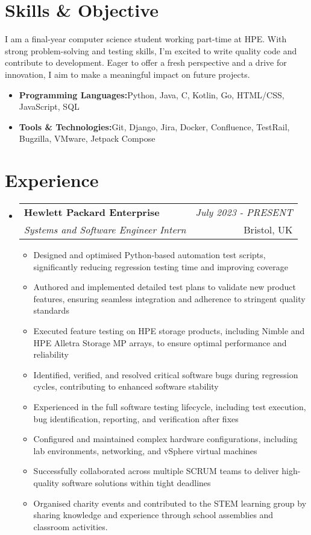 \documentclass[a4paper,11pt]{article}
\makeatletter
\newcommand{\resumeItem}[2]{
  \item{
    \textbf{#1}{\hspace{0.5mm}#2 \vspace{-0.5mm}}
  }
}
\newcommand{\resumeSubheading}[4]{
\vspace{0.5mm}\item
    \begin{tabular*}{0.98\textwidth}[t]{l@{\extracolsep{\fill}}r}
        \textbf{#1} & \textit{\footnotesize{#4}} \\
        \textit{\footnotesize{#3}} &  \footnotesize{#2}\\
    \end{tabular*}
    \vspace{-1mm}
}
\newcommand{\resumeSubItem}[2]{\resumeItem{#1}{#2}\vspace{-4pt}}
\newcommand{\resumeSubHeadingListStart}{\begin{itemize}[leftmargin=*,labelsep=1mm]}
\newcommand{\resumeHeadingSkillStart}{\begin{itemize}[leftmargin=*,itemsep=1.7mm, rightmargin=2ex]}
\newcommand{\resumeItemListStart}{\begin{itemize}[leftmargin=*,labelsep=1mm,itemsep=0.5mm]}
\newcommand{\resumeSubHeadingListEnd}{\end{itemize}\vspace{2mm}}
\newcommand{\resumeHeadingSkillEnd}{\end{itemize}\vspace{-2mm}}
\newcommand{\resumeItemListEnd}{\end{itemize}\vspace{-2mm}}
\makeatother
\begin{document}
\section{\textbf{Skills \& Objective}}
\vspace{1mm}
\small{
I am a final-year computer science student working part-time at HPE. With strong problem-solving and testing skills, I’m excited to write quality code and contribute to development. Eager to offer a fresh perspective and a drive for innovation, I aim to make a meaningful impact on future projects.
\vspace{1mm}
 \resumeHeadingSkillStart
  \resumeSubItem{Programming Languages:}
    {Python, Java, C, Kotlin, Go, HTML/CSS, JavaScript, SQL}
  \resumeSubItem{Tools \& Technologies:}
    {Git, Django, Jira, Docker, Confluence, TestRail, Bugzilla, VMware, Jetpack Compose }
 \resumeHeadingSkillEnd


 

\section{\textbf{Experience}}
\vspace{-0.4mm}
  \resumeSubHeadingListStart
  \resumeSubheading
      {{Hewlett Packard Enterprise}}{Bristol, UK}
      {Systems and Software Engineer Intern}{July 2023 - PRESENT}
      \resumeItemListStart
        \item Designed and optimised Python-based automation test scripts, significantly reducing regression testing time and improving coverage
        \item Authored and implemented detailed test plans to validate new product features, ensuring seamless integration and adherence to stringent quality standards
        \item Executed feature testing on HPE storage products, including Nimble and HPE Alletra Storage MP arrays, to ensure optimal performance and reliability
        \item Identified, verified, and resolved critical software bugs during regression cycles, contributing to enhanced software stability
        \item Experienced in the full software testing lifecycle, including test execution, bug identification, reporting, and verification after fixes
        \item Configured and maintained complex hardware configurations, including lab environments, networking, and vSphere virtual machines
        \item Successfully collaborated across multiple SCRUM teams to deliver high-quality software solutions within tight deadlines
        \item Organised charity events and contributed to the STEM learning group by sharing knowledge and experience through school assemblies and classroom activities.
      \resumeItemListEnd 
  \resumeSubHeadingListEnd
\vspace{-6mm}

}
\end{document}
